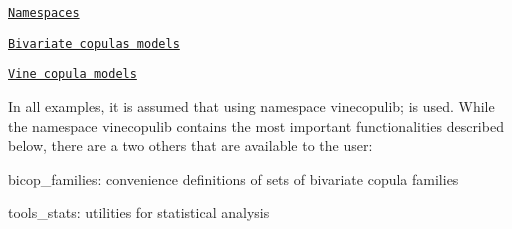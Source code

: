 
\begin{DoxyItemize}
\item \href{#namespaces}{\tt Namespaces}
\item \href{#bicop}{\tt Bivariate copulas models}
\item \href{#vinecop}{\tt Vine copula models}
\end{DoxyItemize}

In all examples, it is assumed that {\ttfamily using namespace vinecopulib;} is used. While the namespace {\ttfamily vinecopulib} contains the most important functionalities described below, there are a two others that are available to the user\+:
\begin{DoxyItemize}
\item {\ttfamily bicop\+\_\+families}\+: convenience definitions of sets of bivariate copula families
\item {\ttfamily tools\+\_\+stats}\+: utilities for statistical analysis 
\end{DoxyItemize}